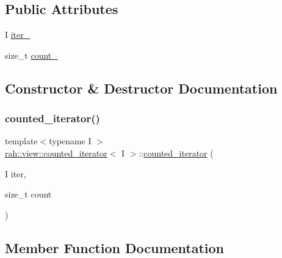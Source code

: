 \subsection*{Public Attributes}
\begin{DoxyCompactItemize}
\item 
I \mbox{\hyperlink{structrah_1_1view_1_1counted__iterator_a907dba6ac64293e4c5718e522da4972e}{iter\+\_\+}}
\item 
size\+\_\+t \mbox{\hyperlink{structrah_1_1view_1_1counted__iterator_a235949f8f72f083b6a65e6f385327d42}{count\+\_\+}}
\end{DoxyCompactItemize}


\subsection{Constructor \& Destructor Documentation}
\mbox{\label{structrah_1_1view_1_1counted__iterator_aa26e9c047e175303c296758316634890}} 
\subsubsection{\texorpdfstring{counted\_iterator()}{counted\_iterator()}}
{\footnotesize\ttfamily template$<$typename I $>$ \\
\mbox{\hyperlink{structrah_1_1view_1_1counted__iterator}{rah\+::view\+::counted\+\_\+iterator}}$<$ I $>$\+::\mbox{\hyperlink{structrah_1_1view_1_1counted__iterator}{counted\+\_\+iterator}} (\begin{DoxyParamCaption}\item[{I}]{iter,  }\item[{size\+\_\+t}]{count }\end{DoxyParamCaption})\hspace{0.3cm}{\ttfamily [inline]}}



\subsection{Member Function Documentation}
\mbox{\label{structrah_1_1view_1_1counted__iterator_abef44b581abb0c70a79dbd6a61ccd200}} 
